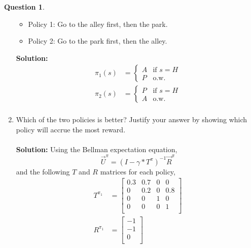 \documentclass{article}
\theoremstyle{definition}
\newtheorem{question}[thm]{Question}
\begin{document}
\begin{question}
\begin{enumerate}[label=\alph*)]
        \begin{itemize}[noitemsep]
            \item Policy 1: Go to the alley first, then the park.
            \item Policy 2: Go to the park first, then the alley.
        \end{itemize}
        \textbf{Solution: }
        \begin{align*}
            \pi_1(s) &= \begin{cases}
                            A& \text{if } s=H\\
                            P&\text{o.w.}
                        \end{cases}\\
            \pi_2(s) &= \begin{cases}
                            P& \text{if } s=H\\
                            A&\text{o.w.}
                        \end{cases}\\
        \end{align*}
        \item Which of the two policies is better? Justify your answer by showing which policy will accrue the most reward. \\ \\
        \textbf{Solution: } Using the Bellman expectation equation,
        \begin{equation*}
            \vec{U}^\pi = (I - \gamma*T^\pi)^{-1}\vec{R}^\pi
        \end{equation*}
        and the following $T$ and $R$ matrices for each policy,
        \begin{align*}
            T^{\pi_1} &= \begin{bmatrix}
                            0.3 & 0.7 & 0 & 0\\
                            0 & 0.2 & 0 & 0.8\\
                            0 & 0 & 1 & 0\\
                            0 & 0 & 0 & 1\\
                         \end{bmatrix}\\
            R^{\pi_1} &= 
            \begin{bmatrix}
                -1\\
                -1\\
                0\\

\end{bmatrix}
\end{align*}
\end{enumerate}
\end{question}
\end{document}
